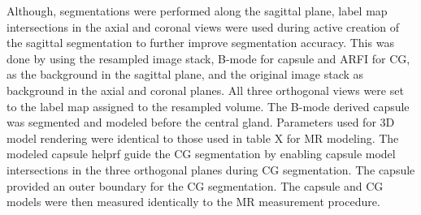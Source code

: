 Although, segmentations were performed along the sagittal plane, label map
intersections in the axial and coronal views were used during active creation
of the sagittal segmentation to further improve segmentation accuracy.  This
was done by using the resampled image stack, B-mode for capsule and ARFI for
CG, as the background in the sagittal plane, and the original image stack as
background in the axial and coronal planes. All three orthogonal views were set
to the label map assigned to the resampled volume. The B-mode derived capsule
was segmented and modeled before the central gland. Parameters used for 3D
model rendering were identical to those used in table X for MR modeling. The
modeled capsule  helprf guide the CG segmentation by enabling capsule model
intersections in the three orthogonal planes during CG segmentation. The
capsule provided an outer boundary for the CG segmentation. The capsule and CG
models were then measured identically to the MR measurement procedure.




